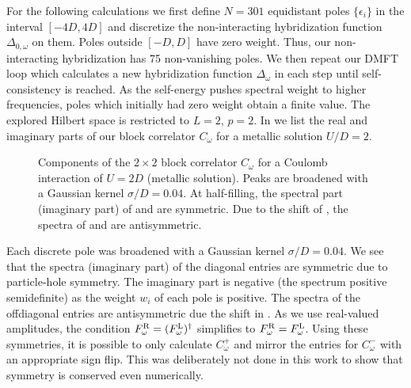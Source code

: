 For the following calculations we first define $N=301$ equidistant poles
$\{\epsilon_i\}$ in the interval $[-4D, 4D]$
and discretize the non-interacting hybridization function $\Delta_{0,\omega}$ on them.
Poles outside $[-D, D]$ have zero weight.
Thus, our non-interacting hybridization has 75 non-vanishing poles.
We then repeat our DMFT loop which calculates a new hybridization function $\Delta_\omega$
in each step until self-consistency is reached.
As the self-energy pushes spectral weight to higher frequencies,
poles which initially had zero weight obtain a finite value.
The explored Hilbert space is restricted to $L=2$, $p=2$.
In  we list the real and imaginary parts
of our block correlator $C_\omega$ for a metallic solution $U/D=2$.
\begin{figure}[ht]
    \centering
    
    \caption{
        Components of the $2\times2$ block correlator $C_\omega$ for
        a Coulomb interaction of $U=2D$ (metallic solution).
        Peaks are broadened with a Gaussian kernel $\sigma/D=0.04$.
        At half-filling, the spectral part (imaginary part) of
         and 
        are symmetric.
        Due to the shift of , the spectra of
         and 
        are antisymmetric.
    }%
    \label{fig:correlators-metal}
\end{figure}
Each discrete pole was broadened with a Gaussian kernel $\sigma/D=0.04$.
We see that the spectra (imaginary part) of the diagonal entries
 are symmetric
due to particle-hole symmetry.
The imaginary part is negative (the spectrum positive semidefinite)
as the weight $w_i$ of each pole is positive.
The spectra of the offdiagonal entries
are antisymmetric due the shift in .
As we use real-valued amplitudes,
the condition $F^{\mathrm{R}}_\omega = (F^{\mathrm{L}}_\omega)^\dag$ simplifies to
$F^{\mathrm{R}}_\omega = F^{\mathrm{L}}_\omega$.
Using these symmetries,
it is possible to only calculate $C^+_\omega$ and mirror the entries for $C^-_\omega$
with an appropriate sign flip.
This was deliberately not done in this work to show that symmetry is conserved even numerically.

